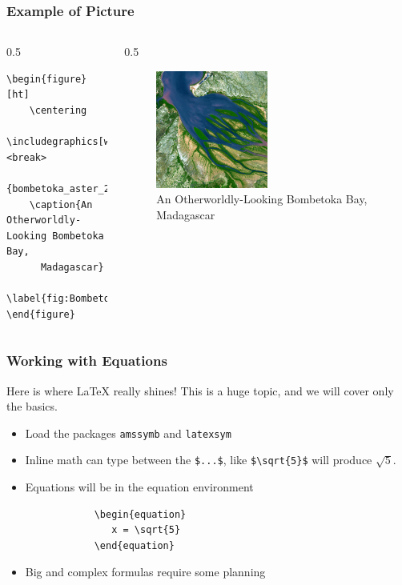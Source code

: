 \documentclass[aspectratio=169]{beamer}
\begin{document}
\begin{frame}[fragile]
\frametitle{Example of Picture}

    \begin{columns}
        \begin{column}{0.5\textwidth}
        \tiny
        \begin{verbatim}
\begin{figure}[ht]
    \centering
    \includegraphics[width=0.5\textwidth] <break>
       {bombetoka_aster_23aug00_lrg}
    \caption{An Otherworldly-Looking Bombetoka Bay, 
      Madagascar}
    \label{fig:Bombetoka_Bay}
\end{figure}        
        \end{verbatim}
        \normalsize
        \end{column}
            
        \begin{column}{0.5\textwidth}
\begin{figure}[ht]
    \centering
    \includegraphics[width=0.5\textwidth]{images/bombetoka_aster_23aug00_lrg.jpg}
    \caption{An Otherworldly-Looking Bombetoka Bay, Madagascar}
    \label{fig:Bombetoka_Bay}
\end{figure}        
        \end{column}
    \end{columns}
    
\end{frame}

\begin{frame}[fragile]
\frametitle{Working with Equations}
    Here is where \LaTeX{} really shines! This is a huge topic, and we will cover only the basics.
    \begin{itemize}
        \item Load the packages \texttt{amssymb} and \texttt{latexsym}
        \item Inline math can type between the \verb|$...$|, like \verb|$\sqrt{5}$| will produce $\sqrt{5}$. 
        \item Equations will be in the equation environment
        \begin{verbatim}
            \begin{equation}
               x = \sqrt{5}
            \end{equation}
        \end{verbatim}
        \item Big and complex formulas require some planning
    \end{itemize}
\end{frame}
\end{document}
